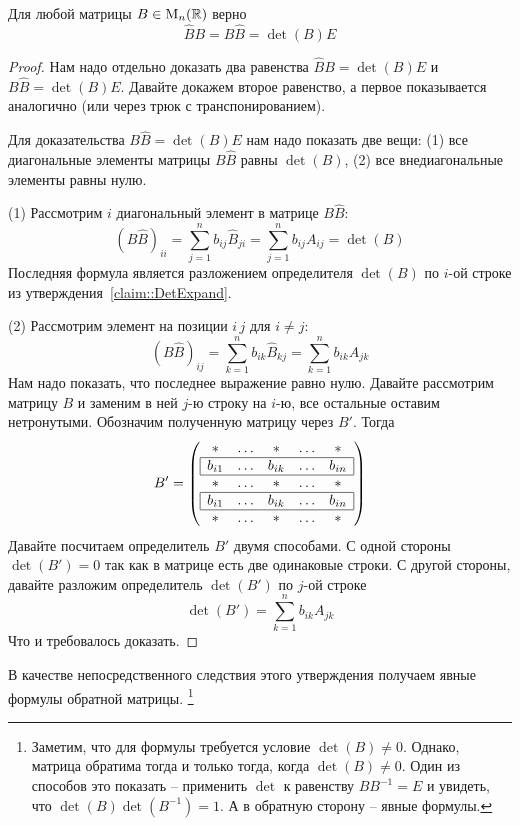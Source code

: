 \begin{claim}
\label{claim::InvMatExplicite}
Для любой матрицы $B\in \operatorname{M}_{n}(\mathbb R)$ верно 
\[
\hat B B = B\hat B = \det(B) E
\]
\end{claim}
\begin{proof}
Нам надо отдельно доказать два равенства $\hat B B = \det (B) E$ и $B\hat B = \det (B) E$.
Давайте докажем второе равенство, а первое показывается аналогично (или через трюк с транспонированием).

Для доказательства $B\hat B = \det (B) E$ нам надо показать две вещи:
(1) все диагональные элементы матрицы $B\hat B$ равны $\det (B)$, (2) все внедиагональные элементы равны нулю.

(1) Рассмотрим $i$ диагональный элемент в матрице $B\hat B$:
\[
(B\hat B)_{ii} = \sum_{j=1}^n b_{ij}\hat B_{ji} = \sum_{j=1}^n b_{ij}A_{ij}=\det(B)
\]
Последняя формула является разложением определителя $\det (B)$ по $i$-ой строке из утверждения~\ref{claim::DetExpand}.

(2) Рассмотрим элемент на позиции $i\,j$ для $i\neq j$:
\[
(B\hat B)_{ij} = \sum_{k=1}^n b_{ik}\hat B_{kj} = \sum_{k=1}^n b_{ik}A_{jk}
\]
Нам надо показать, что последнее выражение равно нулю.
Давайте рассмотрим матрицу $B$ и заменим в ней $j$-ю строку на $i$-ю, все остальные оставим нетронутыми.
Обозначим полученную матрицу через $B'$.
Тогда
\[
B' =
\left(
\begin{array}{ccccc}
{*}&{\ldots}&{*}&{\ldots}&{*}\\
\hline
\multicolumn{1}{|c}{b_{i1}}&{\ldots}&{b_{ik}}&{\ldots}&\multicolumn{1}{c|}{b_{in}}\\
\hline
{*}&{\ldots}&{*}&{\ldots}&{*}\\
\hline
\multicolumn{1}{|c}{b_{i1}}&{\ldots}&{b_{ik}}&{\ldots}&\multicolumn{1}{c|}{b_{in}}\\
\hline
{*}&{\ldots}&{*}&{\ldots}&{*}\\
\end{array}
\right)
\]
Давайте посчитаем определитель $B'$ двумя способами.
С одной стороны $\det(B') = 0$ так как в матрице есть две одинаковые строки.
С другой стороны, давайте разложим определитель $\det(B')$ по $j$-ой строке
\[
\det (B') = \sum_{k=1}^n b_{ik}A_{jk}
\]
Что и требовалось доказать.
\end{proof}

В качестве непосредственного следствия этого утверждения получаем явные формулы обратной матрицы.%
\footnote{Заметим, что для формулы требуется условие $\det (B)\neq 0$.
Однако, матрица обратима тогда и только тогда, когда $\det(B)\neq 0$.
Один из способов это показать -- применить $\det$ к равенству $B B^{-1} = E$ и увидеть, что $\det(B) \det(B^{-1}) = 1$.
А в обратную сторону -- явные формулы.}


